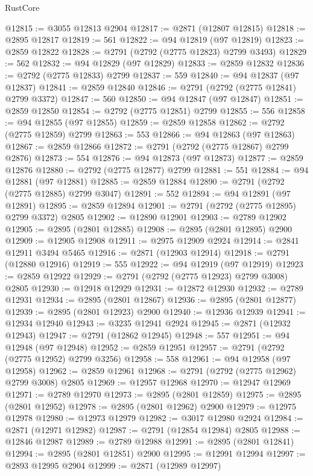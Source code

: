 \begin{lexlean}{RustCore}
\begin{coremodule}
@12815 := @3055 @12813 @2904
@12817 := @2871 (@12807 @12815)
@12818 := @2895 @12817
@12819 := 561
@12822 := @94 @12819 (@97 @12819)
@12823 := @2859 @12822
@12828 := @2791 (@2792 (@2775 @12823) @2799 @3493)
@12829 := 562
@12832 := @94 @12829 (@97 @12829)
@12833 := @2859 @12832
@12836 := @2792 (@2775 @12833) @2799
@12837 := 559
@12840 := @94 @12837 (@97 @12837)
@12841 := @2859 @12840
@12846 := @2791 (@2792 (@2775 @12841) @2799 @3372)
@12847 := 560
@12850 := @94 @12847 (@97 @12847)
@12851 := @2859 @12850
@12854 := @2792 (@2775 @12851) @2799
@12855 := 556
@12858 := @94 @12855 (@97 @12855)
@12859 := @2859 @12858
@12862 := @2792 (@2775 @12859) @2799
@12863 := 553
@12866 := @94 @12863 (@97 @12863)
@12867 := @2859 @12866
@12872 := @2791 (@2792 (@2775 @12867) @2799 @2876)
@12873 := 554
@12876 := @94 @12873 (@97 @12873)
@12877 := @2859 @12876
@12880 := @2792 (@2775 @12877) @2799
@12881 := 551
@12884 := @94 @12881 (@97 @12881)
@12885 := @2859 @12884
@12890 := @2791 (@2792 (@2775 @12885) @2799 @3047)
@12891 := 552
@12894 := @94 @12891 (@97 @12891)
@12895 := @2859 @12894
@12901 := @2791 (@2792 (@2775 @12895) @2799 @3372) @2805
@12902 := @12890 @12901
@12903 := @2789 @12902
@12905 := @2895 (@2801 @12885)
@12908 := @2895 (@2801 @12895) @2900
@12909 := @12905 @12908
@12911 := @2975 @12909 @2924
@12914 := @2841 @12911 @3494 @5465
@12916 := @2871 (@12903 @12914)
@12918 := @2791 (@12880 @12916)
@12919 := 555
@12922 := @94 @12919 (@97 @12919)
@12923 := @2859 @12922
@12929 := @2791 (@2792 (@2775 @12923) @2799 @3008) @2805
@12930 := @12918 @12929
@12931 := @12872 @12930
@12932 := @2789 @12931
@12934 := @2895 (@2801 @12867)
@12936 := @2895 (@2801 @12877)
@12939 := @2895 (@2801 @12923) @2900
@12940 := @12936 @12939
@12941 := @12934 @12940
@12943 := @3235 @12941 @2924
@12945 := @2871 (@12932 @12943)
@12947 := @2791 (@12862 @12945)
@12948 := 557
@12951 := @94 @12948 (@97 @12948)
@12952 := @2859 @12951
@12957 := @2791 (@2792 (@2775 @12952) @2799 @3256)
@12958 := 558
@12961 := @94 @12958 (@97 @12958)
@12962 := @2859 @12961
@12968 := @2791 (@2792 (@2775 @12962) @2799 @3008) @2805
@12969 := @12957 @12968
@12970 := @12947 @12969
@12971 := @2789 @12970
@12973 := @2895 (@2801 @12859)
@12975 := @2895 (@2801 @12952)
@12978 := @2895 (@2801 @12962) @2900
@12979 := @12975 @12978
@12980 := @12973 @12979
@12982 := @3017 @12980 @2924
@12984 := @2871 (@12971 @12982)
@12987 := @2791 (@12854 @12984) @2805
@12988 := @12846 @12987
@12989 := @2789 @12988
@12991 := @2895 (@2801 @12841)
@12994 := @2895 (@2801 @12851) @2900
@12995 := @12991 @12994
@12997 := @2893 @12995 @2904
@12999 := @2871 (@12989 @12997)

\end{coremodule}
\end{lexlean}

